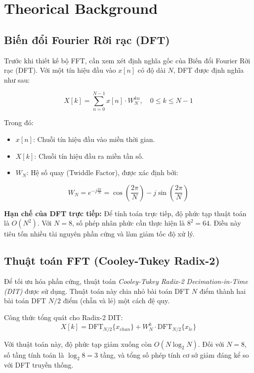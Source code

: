 \section{Theorical Background}

\subsection{Biến đổi Fourier Rời rạc (DFT)}
Trước khi thiết kế bộ FFT, cần xem xét định nghĩa gốc của Biến đổi Fourier Rời rạc (DFT). Với một tín hiệu đầu vào $x[n]$ có độ dài $N$, DFT được định nghĩa như sau:

\begin{equation}
	X[k] = \sum_{n=0}^{N-1} x[n] \cdot W_N^{kn}, \quad 0 \le k \le N-1
\end{equation}

Trong đó:
\begin{itemize}[label=-, leftmargin=2cm]
	\item $x[n]$: Chuỗi tín hiệu đầu vào miền thời gian.
	\item $X[k]$: Chuỗi tín hiệu đầu ra miền tần số.
	\item $W_N$: Hệ số quay (Twiddle Factor), được xác định bởi:
\end{itemize}

\begin{equation}
	W_N = e^{-j\frac{2\pi}{N}} = \cos\left(\frac{2\pi}{N}\right) - j\sin\left(\frac{2\pi}{N}\right)
\end{equation}

\textbf{Hạn chế của DFT trực tiếp:} Để tính toán trực tiếp, độ phức tạp thuật toán là $O(N^2)$. Với $N=8$, số phép nhân phức cần thực hiện là $8^2 = 64$. Điều này tiêu tốn nhiều tài nguyên phần cứng và làm giảm tốc độ xử lý.

\subsection{Thuật toán FFT (Cooley-Tukey Radix-2)}
Để tối ưu hóa phần cứng, thuật toán \textit{Cooley-Tukey Radix-2 Decimation-in-Time (DIT)} được sử dụng. Thuật toán này chia nhỏ bài toán DFT $N$ điểm thành hai bài toán DFT $N/2$ điểm (chẵn và lẻ) một cách đệ quy.

Công thức tổng quát cho Radix-2 DIT:
\begin{equation}
	X[k] = \text{DFT}_{N/2}\{x_{chan}\} + W_N^k \cdot \text{DFT}_{N/2}\{x_{le}\}
\end{equation}

Với thuật toán này, độ phức tạp giảm xuống còn $O(N \log_2 N)$. Đối với $N=8$, số tầng tính toán là $\log_2 8 = 3$ tầng, và tổng số phép tính cơ sở giảm đáng kể so với DFT truyền thống.


